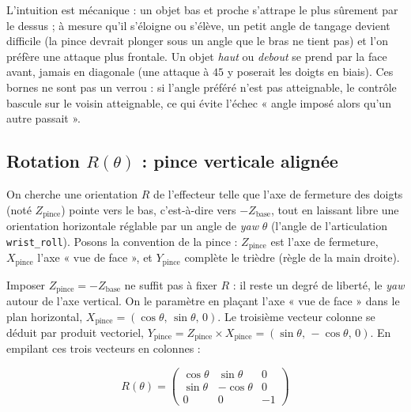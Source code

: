 L'intuition est mécanique : un objet bas et proche s'attrape le plus sûrement par
le dessus ; à mesure qu'il s'éloigne ou s'élève, un petit angle de tangage devient
difficile (la pince devrait plonger sous un angle que le bras ne tient pas) et l'on
préfère une attaque plus frontale. Un objet \emph{haut} ou \emph{debout} se prend
par la face avant, jamais en diagonale (une attaque à \(45\)\textdegree{} y poserait
les doigts en biais). Ces bornes ne sont pas un verrou : si l'angle préféré n'est
pas atteignable, le contrôle bascule sur le voisin atteignable, ce qui évite l'échec
« angle imposé alors qu'un autre passait ».

\subsection{Rotation \texorpdfstring{$R(\theta)$}{R(theta)} : pince verticale alignée}
\label{sub:plan_rotation}

On cherche une orientation \(R\) de l'effecteur telle que l'axe de fermeture des
doigts (noté \(Z_{\text{pince}}\)) pointe vers le bas, c'est-à-dire vers
\(-Z_{\text{base}}\), tout en laissant libre une orientation horizontale réglable
par un angle de \textit{yaw} \(\theta\) (l'angle de l'articulation
\texttt{wrist\_roll}). Posons la convention de la pince : \(Z_{\text{pince}}\)
est l'axe de fermeture, \(X_{\text{pince}}\) l'axe « vue de face », et
\(Y_{\text{pince}}\) complète le trièdre (règle de la main droite).

Imposer \(Z_{\text{pince}} = -Z_{\text{base}}\) ne suffit pas à fixer \(R\) : il
reste un degré de liberté, le \textit{yaw} autour de l'axe vertical. On le
paramètre en plaçant l'axe « vue de face » dans le plan horizontal,
\(X_{\text{pince}} = (\cos\theta,\, \sin\theta,\, 0)\). Le troisième vecteur
colonne se déduit par produit vectoriel,
\(Y_{\text{pince}} = Z_{\text{pince}} \times X_{\text{pince}} = (\sin\theta,\, -\cos\theta,\, 0)\).
En empilant ces trois vecteurs en colonnes :

\begin{equation}
  R(\theta) = \begin{pmatrix}
    \cos\theta &  \sin\theta &  0 \\
    \sin\theta & -\cos\theta &  0 \\
    0          &  0          & -1
  \end{pmatrix}
\end{equation}

